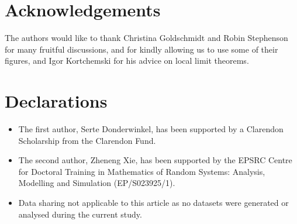 \section*{Acknowledgements}
The authors would like to thank Christina Goldschmidt and Robin Stephenson for many fruitful discussions, and for kindly allowing us to use some of their figures, and Igor Kortchemski for his advice on local limit theorems.

\section*{Declarations}

\begin{itemize}
    \item The first author, Serte Donderwinkel, has been supported by a Clarendon Scholarship from the Clarendon Fund.
    \item The second author, Zheneng Xie, has been supported by the EPSRC Centre for Doctoral Training in Mathematics of Random Systems: Analysis, Modelling and Simulation (EP/S023925/1).
    \item  Data sharing not applicable to this article as no datasets were generated or analysed during the current study.
\end{itemize}
